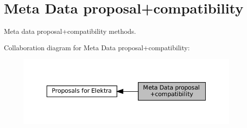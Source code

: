 \hypertarget{group__meta}{}\section{Meta Data proposal+compatibility}
\label{group__meta}


Meta data proposal+compatibility methods.  


Collaboration diagram for Meta Data proposal+compatibility\+:
\nopagebreak
\begin{figure}[H]
\begin{center}
\leavevmode
\includegraphics[width=347pt]{group__meta}
\end{center}
\end{figure}
